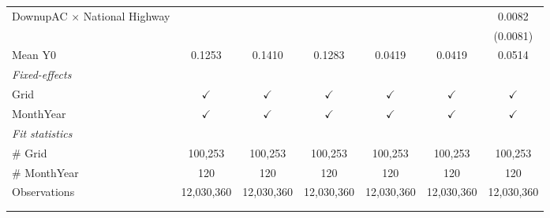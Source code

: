 \begin{table}[htbp]
\begin{tabular}{lcccccc}
      DownupAC $\times$ National Highway                         &               &               &               &               &               & 0.0082\\   
                                                                 &               &               &               &               &               & (0.0081)\\   
      \hline Mean Y0                                             & 0.1253        & 0.1410        & 0.1283        & 0.0419        & 0.0419        & 0.0514\\  
      \midrule
      \emph{Fixed-effects}\\
      Grid                                                       & $\checkmark$  & $\checkmark$  & $\checkmark$  & $\checkmark$  & $\checkmark$  & $\checkmark$\\   
      MonthYear                                                  & $\checkmark$  & $\checkmark$  & $\checkmark$  & $\checkmark$  & $\checkmark$  & $\checkmark$\\   
      \midrule
      \emph{Fit statistics}\\
      \# Grid                                                    & 100,253       & 100,253       & 100,253       & 100,253       & 100,253       & 100,253\\  
      \# MonthYear                                               & 120           & 120           & 120           & 120           & 120           & 120\\  
      Observations                                               & 12,030,360    & 12,030,360    & 12,030,360    & 12,030,360    & 12,030,360    & 12,030,360\\  
      \midrule \midrule
                                                                 &               &               &               &               &               &  \tabularnewline 
      \\
   \end{tabular}
\end{table}


